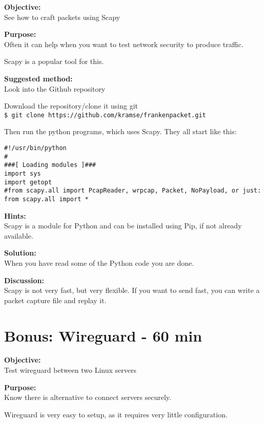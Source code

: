 \documentclass[a4paper,11pt,notitlepage]{report}
\begin{document}
{\bf Objective:}\\
See how to craft packets using Scapy

{\bf Purpose:}\\
Often it can help when you want to test network security to produce traffic.

Scapy is a popular tool for this.\\

{\bf Suggested method:}\\
Look into the Github repository\\

Download the repository/clone it using git\\
\verb+$ git clone https://github.com/kramse/frankenpacket.git+

Then run the python programs, which uses Scapy. They all start like this:

\begin{verbatim}
#!/usr/bin/python
#
###[ Loading modules ]###
import sys
import getopt
#from scapy.all import PcapReader, wrpcap, Packet, NoPayload, or just:
from scapy.all import *
\end{verbatim}

{\bf Hints:}\\
Scapy is a module for Python and can be installed using Pip, if not already available.

{\bf Solution:}\\
When you have read some of the Python code you are done.

{\bf Discussion:}\\
Scapy is not very fast, but very flexible. If you want to send fast, you can write a packet capture file and replay it.



\chapter{Bonus: Wireguard - 60 min}
\label{ex:wireguard-setup}

{\bf Objective:}\\
Test wireguard between two Linux servers


{\bf Purpose:}\\
Know there is alternative to connect servers securely.

Wireguard is very easy to setup, as it requires very little configuration.
\end{document}
